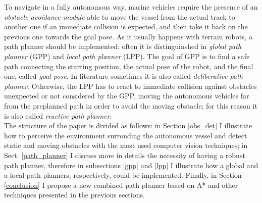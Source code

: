 \documentclass[journal]{IEEEtran}
\begin{document}
\indent To navigate in a fully autonomous way, marine vehicles require the presence of an \textit{obstacle avoidance module} able to move the vessel from the actual track to another one if an immediate collision is expected, and then take it back on the previous one towards the goal pose. As it usually happens with terrain robots, a path planner should be implemented: often it is distinguinshed in \textit{global path planner} (GPP) and \textit{local path planner} (LPP). The goal of GPP is to find a safe path connecting the starting position, the actual pose of the robot, and the final one, called \textit{goal pose}. In literature sometimes it is also called \textit{deliberative path planner}. Otherwise, the LPP has to react to immediate collision against obstacles unexpected or not considered by the GPP, moving the autonomous vehicles far from the preplanned path in order to avoid the moving obstacle; for this reason it is also called \textit{reactive path planner}.\\
\indent The structure of the paper is divided as follows: in Section \ref{obs_det} I illustrate how to perceive the environment surronding the autonomous vessel and detect static and moving obstacles with the most used computer vision techniques; in Sect. \ref{path_planner} I discuss more in details the necessity of having a robust path planner, therefore in subsections \ref{gpp} and \ref{lpp} I illustrate how a global and a local path planners, respectively, could be implemented. Finally, in Section \ref{conclusion} I propose a new combined path planner based on A* and other techniques presented in the previous sections.
\end{document}
